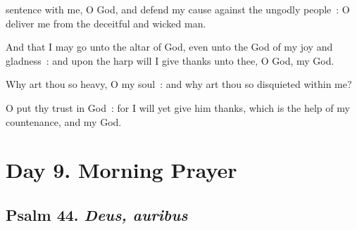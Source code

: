 
 sentence with me, O God, and defend my cause against the ungodly people~: O deliver me from the deceitful and wicked man.\par
{}
And that I may go unto the altar of God, even unto the God of my joy and gladness~: and upon the harp will I give thanks unto thee, O God, my God.\par
{}Why art thou so heavy, O my soul~: and why art thou so disquieted within me?\par
{}O put thy trust in God~: for I will yet give him thanks, which is the help of my countenance, and my God.\par

\section*{Day 9. Morning Prayer}

\subsection{Psalm 44. \textit{Deus, auribus}}


